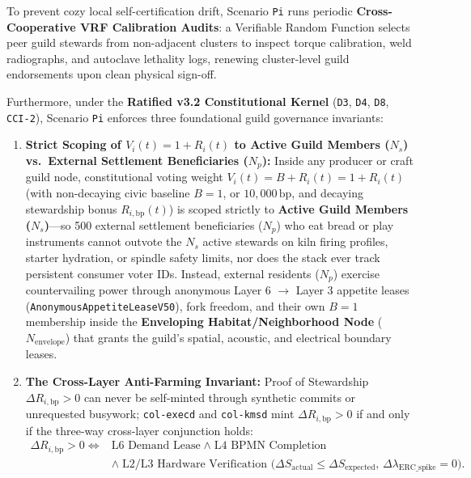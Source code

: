 To prevent cozy local self-certification drift, Scenario \texttt{Pi} runs periodic \textbf{Cross-Cooperative
VRF Calibration Audits}: a Verifiable Random Function selects peer guild stewards from non-adjacent clusters
to inspect torque calibration, weld radiographs, and autoclave lethality logs, renewing cluster-level guild
endorsements upon clean physical sign-off.

Furthermore, under the \textbf{Ratified v3.2 Constitutional Kernel} (\texttt{D3}, \texttt{D4}, \texttt{D8},
\texttt{CCI-2}), Scenario \texttt{Pi} enforces three foundational guild governance invariants:
\begin{enumerate}
    \item \textbf{Strict Scoping of $V_i(t) = 1 + R_i(t)$ to Active Guild Members ($N_s$) vs.\ External Settlement Beneficiaries ($N_p$):}
    Inside any producer or craft guild node, constitutional voting weight $V_i(t) = B + R_i(t) = 1 + R_i(t)$
    (with non-decaying civic baseline $B = 1$, or $10{,}000\,\mathrm{bp}$, and decaying stewardship bonus
    $R_{i,\mathrm{bp}}(t)$) is scoped strictly to \textbf{Active Guild Members ($N_s$)}---so 500 external
    settlement beneficiaries ($N_p$) who eat bread or play instruments cannot outvote the $N_s$ active
    stewards on kiln firing profiles, starter hydration, or spindle safety limits, nor does the stack ever
    track persistent consumer voter IDs. Instead, external residents ($N_p$) exercise countervailing power
    through anonymous Layer 6 $\to$ Layer 3 appetite leases (\texttt{AnonymousAppetiteLeaseV50}), fork
    freedom, and their own $B = 1$ membership inside the \textbf{Enveloping Habitat/Neighborhood Node}
    ($N_{\mathrm{envelope}}$) that grants the guild's spatial, acoustic, and electrical boundary leases.
    \item \textbf{The Cross-Layer Anti-Farming Invariant:} Proof of Stewardship $\Delta R_{i,\mathrm{bp}} > 0$
    can never be self-minted through synthetic commits or unrequested busywork; \texttt{col-execd} and
    \texttt{col-kmsd} mint $\Delta R_{i,\mathrm{bp}} > 0$ if and only if the three-way cross-layer
    conjunction holds:
    \begin{equation}
    \begin{aligned}
        \Delta R_{i,\mathrm{bp}} > 0 \iff{} &\text{L6 Demand Lease} \;\land\; \text{L4 BPMN Completion} \\
        &\land\; \text{L2/L3 Hardware Verification }\bigl(\Delta S_{\mathrm{actual}} \le \Delta S_{\mathrm{expected}},\, \Delta\lambda_{\mathrm{ERC\_spike}} = 0\bigr).

\end{aligned}
\end{equation}
\end{enumerate}
